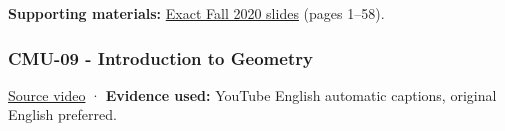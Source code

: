 \textbf{Supporting materials:} \href{https://15462.courses.cs.cmu.edu/fall2020content/lectures/08_depthtransparency/08_depthtransparency_slides.pdf}{Exact Fall 2020 slides} (pages 1--58).

\subsubsection{CMU-09 - Introduction to Geometry}\label{04-visual-computing-ii-ch036-cmu-09---introduction-to-geometry}

\hypertarget{04-visual-computing-ii-ch036-cmu-09---introduction-to-geometry}{}

\href{https://www.youtube.com/watch?v=MakhXtIX2YM}{Source video} · \textbf{Evidence used:} YouTube English automatic captions, original English preferred.

